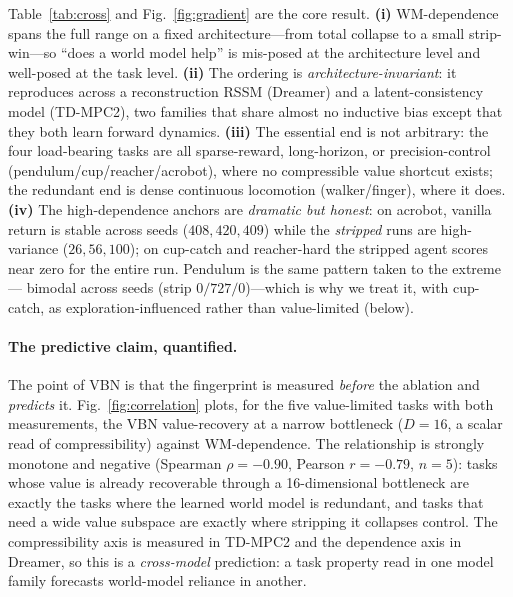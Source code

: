 \documentclass[letterpaper]{article}
\begin{document}
Table~\ref{tab:cross} and Fig.~\ref{fig:gradient} are the core result.
\textbf{(i)} WM-dependence spans the full range on a fixed architecture---from
total collapse to a small strip-win---so ``does a world model help'' is
mis-posed at the architecture level and well-posed at the task level.
\textbf{(ii)} The ordering is \emph{architecture-invariant}: it reproduces
across a reconstruction RSSM (Dreamer) and a latent-consistency model
(TD-MPC2), two families that share almost no inductive bias except that they
both learn forward dynamics. \textbf{(iii)} The essential end is not arbitrary:
the four load-bearing tasks are all sparse-reward, long-horizon, or
precision-control (pendulum/cup/reacher/acrobot), where no compressible value
shortcut exists; the redundant end is dense continuous locomotion
(walker/finger), where it does. \textbf{(iv)} The high-dependence anchors are
\emph{dramatic but honest}: on acrobot, vanilla return is stable across seeds
($408,420,409$) while the \emph{stripped} runs are high-variance
($26,56,100$); on cup-catch and reacher-hard the stripped agent scores near
zero for the entire run. Pendulum is the same pattern taken to the extreme---
bimodal across seeds (strip $0/727/0$)---which is why we treat it, with
cup-catch, as exploration-influenced rather than value-limited (below).

\paragraph{The predictive claim, quantified.}
The point of VBN is that the fingerprint is measured \emph{before} the
ablation and \emph{predicts} it. Fig.~\ref{fig:correlation} plots, for the five
value-limited tasks with both measurements, the VBN value-recovery at a narrow
bottleneck ($D{=}16$, a scalar read of compressibility) against WM-dependence.
The relationship is strongly monotone and negative (Spearman
$\rho{=}{-}0.90$, Pearson $r{=}{-}0.79$, $n{=}5$): tasks whose value is already
recoverable through a 16-dimensional bottleneck are exactly the tasks where the
learned world model is redundant, and tasks that need a wide value subspace are
exactly where stripping it collapses control. The compressibility axis is
measured in TD-MPC2 and the dependence axis in Dreamer, so this is a
\emph{cross-model} prediction: a task property read in one model family
forecasts world-model reliance in another.
\end{document}
